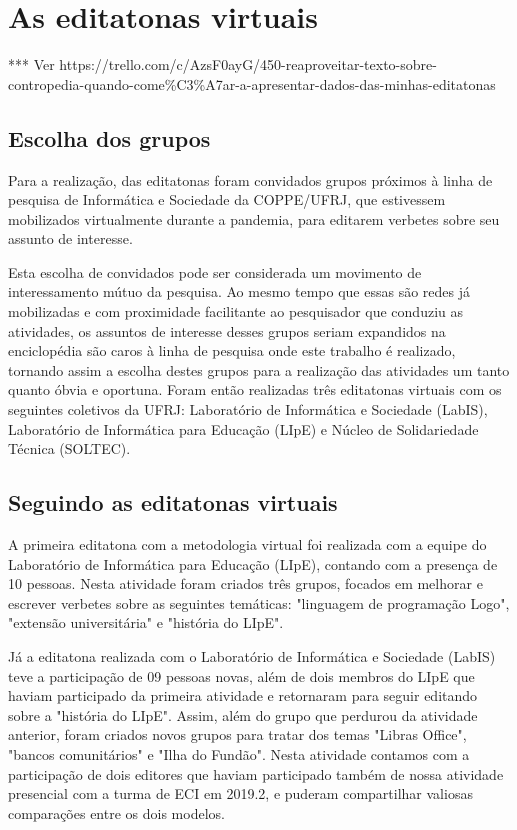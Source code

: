 
\section{As editatonas virtuais}

*** Ver https://trello.com/c/AzsF0ayG/450-reaproveitar-texto-sobre-contropedia-quando-come\%C3\%A7ar-a-apresentar-dados-das-minhas-editatonas

\subsection{Escolha dos grupos}

Para a realização, das editatonas foram convidados grupos próximos à linha de pesquisa de Informática e Sociedade da COPPE/UFRJ, que estivessem mobilizados virtualmente durante a pandemia, para editarem verbetes sobre seu assunto de interesse.

Esta escolha de convidados pode ser considerada um movimento de interessamento mútuo da pesquisa. Ao mesmo tempo que essas são redes já mobilizadas e com proximidade facilitante ao pesquisador que conduziu as atividades, os assuntos de interesse desses grupos seriam expandidos na enciclopédia são caros à linha de pesquisa onde este trabalho é realizado, tornando assim a escolha destes grupos para a realização das atividades um tanto quanto óbvia e oportuna.
 Foram então realizadas três editatonas virtuais com os seguintes coletivos da UFRJ: Laboratório de Informática e Sociedade (LabIS), Laboratório de Informática para Educação (LIpE) e Núcleo de Solidariedade Técnica (SOLTEC).
 
\subsection{Seguindo as editatonas virtuais}

A primeira editatona com a metodologia virtual foi realizada com a equipe do Laboratório de Informática para Educação (LIpE), contando com a presença de 10 pessoas. Nesta atividade foram criados três grupos, focados em melhorar e escrever verbetes sobre as seguintes temáticas: "linguagem de programação Logo", "extensão universitária" e "história do LIpE".

Já a editatona realizada com o Laboratório de Informática e Sociedade (LabIS) teve a participação de 09 pessoas novas, além de dois membros do LIpE que haviam participado da primeira atividade e retornaram para seguir editando sobre a "história do LIpE". Assim, além do grupo que perdurou da atividade anterior, foram criados novos grupos para tratar dos temas "Libras Office", "bancos comunitários" e "Ilha do Fundão". Nesta atividade contamos com a participação de dois editores que haviam participado também de nossa atividade presencial com a turma de ECI em 2019.2, e puderam compartilhar valiosas comparações entre os dois modelos.

